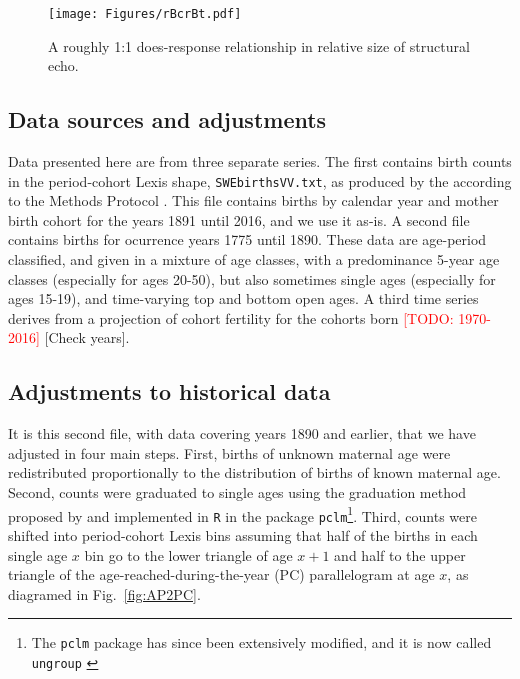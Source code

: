 \documentclass{article}
\renewcommand{\todo}[1]{\textcolor{red}{[TODO: #1]}}
\begin{document}
\begin{figure}
\texttt{[image: Figures/rBcrBt.pdf]}
\caption{A roughly 1:1 does-response relationship in relative size of structural echo.}
\label{fig:rBcrBt}
\end{figure}

\FloatBarrier

\singlespacing

   
  
\pagebreak
\begin{appendix}
\section{Data sources and adjustments}
\label{sec:dataprep}
Data presented here are from three separate series. The first
contains birth counts in the period-cohort Lexis shape,
\texttt{SWEbirthsVV.txt}, as produced by the \citet{HFD} according to the Methods
Protocol \citep{hfd2015methods}. This file contains births by calendar year and
mother birth cohort for the years 1891 until 2016, and we use it as-is. A
second file contains births for ocurrence years 1775 until 1890. These data are
age-period classified, and given in a mixture of age classes, with a
predominance 5-year age classes (especially for ages 20-50), but also sometimes
single ages (especially for ages 15-19), and time-varying top and bottom open
ages. A third time series derives from a projection of cohort fertility for the cohorts born \todo{1970-2016} [Check years].

\subsection{Adjustments to historical data}
It is this second file, with data covering years 1890 and earlier, that we have
adjusted in four main steps. First, births of unknown maternal age were redistributed proportionally to the distribution of births of known maternal age. Second, counts were graduated to single ages using the graduation method proposed by \citet{rizzi2015efficient} and implemented in \texttt{R} in the package \texttt{pclm}\footnote{The \texttt{pclm} package has since been extensively modified, and it is now called \texttt{ungroup} \citep{pclmR}}. Third, counts were shifted into period-cohort Lexis bins assuming that half of the births in each single age $x$ bin go to the lower triangle of age $x+1$ and half to the upper triangle of the age-reached-during-the-year (PC) parallelogram at age $x$, as diagramed in Fig.~\ref{fig:AP2PC}.


\end{appendix}
\end{document}
